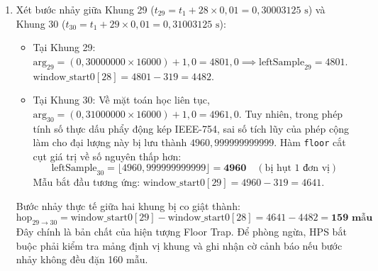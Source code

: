 \begin{enumerate}[label=(\alph*)]
    \item Xét bước nhảy giữa Khung 29 ($t_{29} = t_1 + 28 \times 0{,}01 = 0{,}30003125\text{ s}$) và Khung 30 ($t_{30} = t_1 + 29 \times 0{,}01 = 0{,}31003125\text{ s}$):
    \begin{itemize}[leftmargin=1.5em, itemsep=1pt]
        \item Tại Khung 29: $\text{arg}_{29} = (0{,}30000000 \times 16000) + 1{,}0 = 4801{,}0 \implies \text{leftSample}_{29} = 4801$.
        $\text{window\_start0}[28] = 4801 - 319 = 4482$.
        \item Tại Khung 30: Về mặt toán học liên tục, $\text{arg}_{30} = (0{,}31000000 \times 16000) + 1{,}0 = 4961{,}0$. Tuy nhiên, trong phép tính số thực dấu phẩy động kép IEEE-754, sai số tích lũy của phép cộng làm cho đại lượng này bị lưu thành $4960{,}999999999999$.
        Hàm \texttt{floor} cắt cụt giá trị về số nguyên thấp hơn:
        \begin{equation}
        \text{leftSample}_{30} = \lfloor 4960{,}999999999999 \rfloor = \mathbf{4960} \quad (\text{bị hụt 1 đơn vị})
        \end{equation}
        Mẫu bắt đầu tương ứng: $\text{window\_start0}[29] = 4960 - 319 = 4641$.
    \end{itemize}
    Bước nhảy thực tế giữa hai khung bị co giật thành:
    \begin{equation}
    \text{hop}_{29 \to 30} = \text{window\_start0}[29] - \text{window\_start0}[28] = 4641 - 4482 = \mathbf{159\text{ mẫu}}
    \end{equation}
    Đây chính là bản chất của hiện tượng Floor Trap. Để phòng ngừa, HPS bắt buộc phải kiểm tra mảng định vị khung và ghi nhận cờ cảnh báo nếu bước nhảy không đều đặn 160 mẫu.
\end{enumerate}

